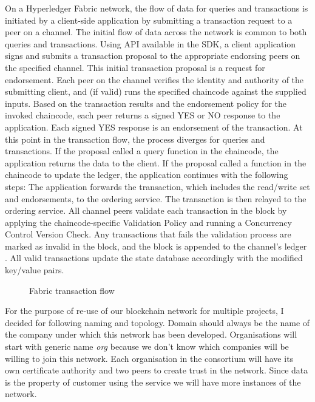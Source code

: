 On a Hyperledger Fabric network, the flow of data for queries and transactions is initiated by a client-side application by submitting a transaction request to a peer on a channel. The initial flow of data across the network is common to both queries and transactions. Using API available in the SDK, a client application signs and submits a transaction proposal to the appropriate endorsing peers on the specified channel. This initial transaction proposal is a request for endorsement. Each peer on the channel verifies the identity and authority of the submitting client, and (if valid) runs the specified chaincode against the supplied inputs. Based on the transaction results and the endorsement policy for the invoked chaincode, each peer returns a signed YES or NO response to the application. Each signed YES response is an endorsement of the transaction.
At this point in the transaction flow, the process diverges for queries and transactions. If the proposal called a query function in the chaincode, the application returns the data to the client. If the proposal called a function in the chaincode to update the ledger, the application continues with the following steps: The application forwards the transaction, which includes the read/write set and endorsements, to the ordering service. The transaction is then relayed to the ordering service. All channel peers validate each transaction in the block by applying the chaincode-specific Validation Policy and running a Concurrency Control Version Check.
Any transactions that fails the validation process are marked as invalid in the block, and the block is appended to the channel's ledger \cite{transaction_flow}. All valid transactions update the state database accordingly with the modified key/value pairs.

\begin{figure}[H]
    \begin{center}
        \begin{minipage}{\linewidth}
            \begin{center}
                \caption{Fabric transaction flow }
                \label{obr 1.2.1}
            \end{center}
        \end{minipage}
    \end{center}
\end{figure}

For the purpose of re-use of our blockchain network for multiple projects, I decided for following naming and topology. Domain should always be the name of the company under which this network has been developed. Organisations will start with generic name \emph{org} because we don't know which companies will be willing to join this network. Each organisation in the consortium will have its own certificate authority and two peers to create trust in the network. Since data is the property of customer using the service we will have more instances of the network. 


